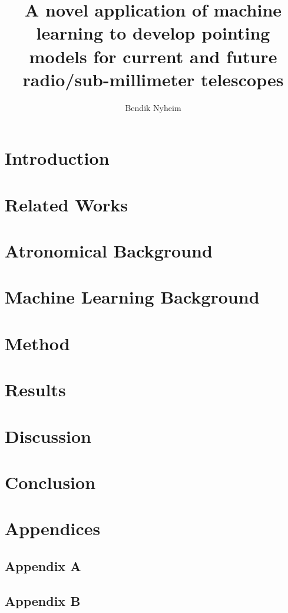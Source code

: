 \documentclass[a4paper, USenglish, 11pt]{report}
\author{Bendik Nyheim}
\title{A novel application of machine learning to develop pointing models for current and future radio/sub-millimeter telescopes}
\begin{document}

\uiomasterfp[master, program={Computational Science: Physics},
color=blue,image = {teleskopgutt2},
supervisors = {Signe Riemer Sørensen (Sintef) \and Rodrigo Parrar (ESO) \and Claudia Cicone (UiO)}]


\tableofcontents 

\chapter{Introduction}


\chapter{Related Works}


\chapter{Atronomical Background}



\chapter{Machine Learning Background}


\chapter{Method}


\chapter{Results}


\chapter{Discussion}


\chapter{Conclusion}



\appendix
\chapter*{Appendices}
\section{Appendix A}\label{sec:appendix_a}


\section{Appendix B}\label{sec:appendix_b}



\newpage


\end{document}
